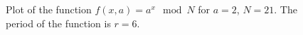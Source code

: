 \begin{figure}
\centering



\caption{Plot of the function $f\left(x, a\right) = a^x \mod{N}$ for $a=2$, $N
  = 21$. The period of the function is $r=6$.}
\label{picPart4QuantCompShorClassPart}
\end{figure}